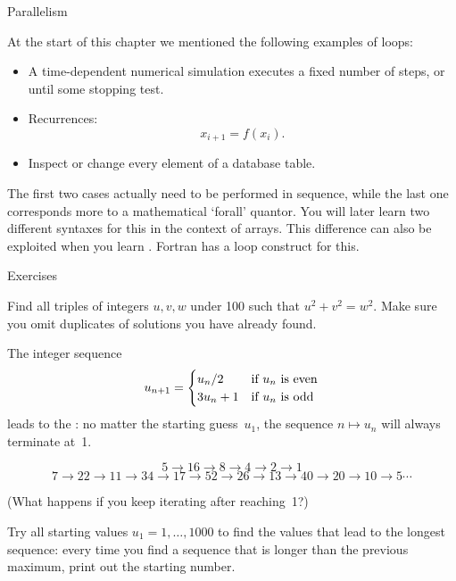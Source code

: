  {Parallelism}

At the start of this chapter we mentioned the following examples of loops:
\begin{itemize}
\item A time-dependent numerical simulation executes a fixed number of
  steps, or until some stopping test.
\item Recurrences: \[ x_{i+1} = f(x_i). \]
\item Inspect or change every element of a database table.
\end{itemize}
The first two cases actually need to be performed in sequence, while
the last one corresponds more to a mathematical `forall' quantor. You
will later learn two different syntaxes for this in the context of arrays.
This
difference can also be exploited when you learn
. Fortran has a
 loop construct for this.

 {Exercises}

\begin{exercise}
  \label{ex:pythagoras}
  Find all triples of integers $u,v,w$ under 100 such that
  $u^2+v^2=w^2$. Make sure you omit duplicates of solutions you have
  already found.
\end{exercise}

\begin{exercise}
  \label{ex:collatz}
  The integer sequence
  \[ u_{n+1} = 
  \begin{cases}
    u_n/2&\hbox{if $u_n$ is even}\\
    3u_n+1&\hbox{if $u_n$ is odd}\\
  \end{cases}
  \]
  leads to the : no matter the starting guess~$u_1$,
  the sequence $n\mapsto u_n$ will always terminate at~1.

  { \small
  \[ 5\rightarrow 16\rightarrow 8\rightarrow 4\rightarrow 2\rightarrow 1\]
  \[ 7\rightarrow 22\rightarrow 11\rightarrow 34\rightarrow
  17\rightarrow 52\rightarrow 26\rightarrow 13\rightarrow
  40\rightarrow 20\rightarrow 10\rightarrow 5\cdots \]
  }

  (What happens if you keep iterating after reaching~1?)
  
  Try all starting values $u_1=1,\ldots,1000$ to find the values that
  lead to the longest sequence: every time you find a sequence that is
  longer than the previous maximum, print out the starting number.
\end{exercise}

